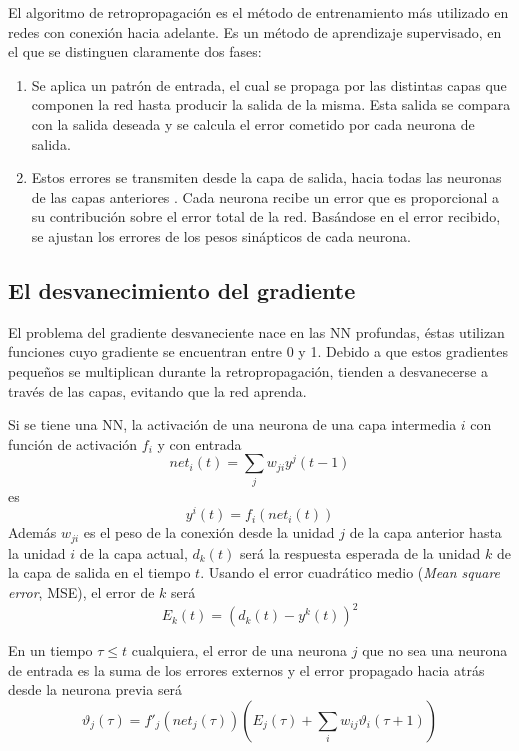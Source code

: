 El algoritmo de retropropagación es el método de entrenamiento más utilizado en redes con conexión hacia adelante. Es un método de aprendizaje supervisado, en el que se distinguen claramente dos fases:
\begin{enumerate}
	\item Se aplica un patrón de entrada, el cual se propaga por las distintas capas que componen la red hasta producir la salida de la misma. Esta salida se compara con la salida deseada y se calcula el error cometido por cada neurona de salida.

	\item Estos errores se transmiten desde la capa de salida, hacia todas las neuronas de las capas anteriores \cite{Fritsch1996}. Cada neurona recibe un error que es proporcional a su contribución sobre el error total de la red. Basándose en el error recibido, se ajustan los errores de los pesos sinápticos de cada neurona.
\end{enumerate}


\subsection{El desvanecimiento del gradiente}\label{sec:desvanecimiento_del_gradiente}
El problema del gradiente desvaneciente nace en las NN profundas, éstas utilizan funciones cuyo gradiente se encuentran entre 0 y 1. Debido a que estos gradientes pequeños se multiplican durante la retropropagación, tienden a desvanecerse a través de las capas, evitando que la red aprenda.

Si se tiene una NN, la activación de una neurona de una capa intermedia $i$ con función de activación $f_i$ y con entrada $$ net_{i}(t) = \sum_{j}w_{ji}y^{j}(t - 1) $$ es $$y^{i}(t) = f_{i}(net_{i}(t))$$ Además $w_{ji}$ es el peso de la conexión desde la unidad $j$ de la capa anterior hasta la unidad $i$ de la capa actual, $d_{k}(t)$ será la respuesta esperada de la unidad $k$ de la capa de salida en el tiempo $t$. Usando el error cuadrático medio ({\em Mean square error}, MSE), el error de $k$ será
$$ E_{k}(t) = (d_{k}(t) - y^{k}(t))^2 $$

En un tiempo $\tau \leq t$ cualquiera, el error de una neurona $j$ que no sea una neurona de entrada es la suma de los errores externos y el error propagado hacia atrás desde la neurona previa será
$$ \vartheta_{j}(\tau) = f'_{j}(net_{j}(\tau))\left(E_{j}(\tau) + \sum_{i} w_{ij}\vartheta_{i}(\tau + 1)\right) $$

